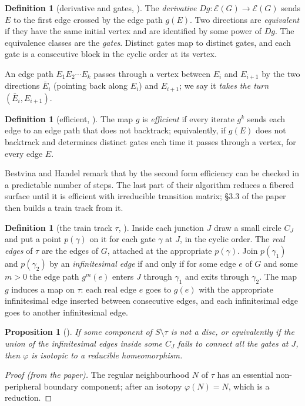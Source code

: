 \documentclass[12pt]{amsart}
\newcommand{\anti}[1]{\bar{#1}}          %
\newcommand{\ho}{\varphi}                 %
\newcommand{\trk}{\tau}                   %
\newcommand{\Dg}{D}                       %
\newcommand{\dirs}{\mathcal{E}}           %
\theoremstyle{plain}
\newtheorem{Proposition}[Theorem]{Proposition}
\theoremstyle{definition}
\newtheorem{Definition}[Theorem]{Definition}
\begin{document}
\begin{Definition}[derivative and gates, {\cite[\S1]{Bestvina1995}}]
  The \emph{derivative} $\Dg g\colon \dirs(G)\to\dirs(G)$ sends $E$ to the
  first edge crossed by the edge path $g(E)$.  Two directions are
  \emph{equivalent} if they have the same initial vertex and are
  identified by some power of $\Dg g$.  The equivalence classes are the
  \emph{gates}.  Distinct gates map to distinct gates, and each gate is a
  consecutive block in the cyclic order at its vertex.
\end{Definition}

An edge path $E_1E_2\cdots E_k$ passes through a vertex between $E_i$ and
$E_{i+1}$ by the two directions $\anti E_i$ (pointing back along $E_i$) and
$E_{i+1}$; we say it \emph{takes the turn} $(\anti E_i,E_{i+1})$.

\begin{Definition}[efficient, {\cite[Lemma 3.1.2]{Bestvina1995}}]
  The map $g$ is \emph{efficient} if every iterate $g^k$ sends each edge
  to an edge path that does not backtrack; equivalently, if $g(E)$ does not
  backtrack and determines distinct gates each time it passes through a
  vertex, for every edge $E$.
\end{Definition}

Bestvina and Handel remark that by the second form efficiency can be
checked in a predictable number of steps.  The last part of their
algorithm reduces a fibered surface until it is efficient with irreducible
transition matrix; \S3.3 of the paper then builds a train track from it.

\begin{Definition}[the train track $\trk$, {\cite[\S3.3]{Bestvina1995}}]
  Inside each junction $J$ draw a small circle $C_J$ and put a point
  $p(\gamma)$ on it for each gate $\gamma$ at $J$, in the cyclic order.  The
  \emph{real edges} of $\trk$ are the edges of $G$, attached at the
  appropriate $p(\gamma)$.  Join $p(\gamma_1)$ and $p(\gamma_2)$ by an
  \emph{infinitesimal edge} if and only if for some edge $e$ of $G$ and
  some $m>0$ the edge path $g^m(e)$ enters $J$ through $\gamma_1$ and exits
  through $\gamma_2$.  The map $g$ induces a map on $\trk$: each real edge
  $e$ goes to $g(e)$ with the appropriate infinitesimal edge inserted
  between consecutive edges, and each infinitesimal edge goes to another
  infinitesimal edge.
\end{Definition}

\begin{Proposition}[{\cite[Prop.~3.3.2]{Bestvina1995}}]
  \label{prop:bh}
  If some component of $S\setminus\trk$ is not a disc, or equivalently if
  the union of the infinitesimal edges inside some $C_J$ fails to connect
  all the gates at $J$, then $\ho$ is isotopic to a reducible
  homeomorphism.
\end{Proposition}
\begin{proof}[Proof (from the paper)]
  The regular neighbourhood $N$ of $\trk$ has an essential non-peripheral
  boundary component; after an isotopy $\ho(N)=N$, which is a reduction.
\end{proof}
\end{document}
